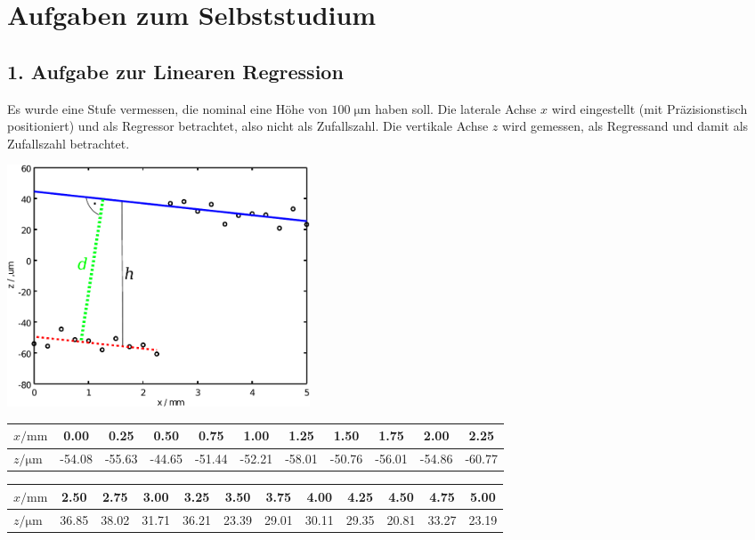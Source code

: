 \section{Aufgaben zum Selbststudium}
\subsection{1. Aufgabe zur Linearen Regression}
\label{Vorl2Regressionsaufg1}
Es wurde eine Stufe vermessen, die nominal eine Höhe von $100 \; \mathrm{\mu m}$ haben soll.
Die laterale Achse $x$ wird eingestellt (mit Präzisionstisch positioniert) 
und als Regressor betrachtet, also nicht als Zufallszahl.
Die vertikale Achse $z$ wird gemessen, als Regressand und damit als Zufallszahl
betrachtet.

\begin{center}
	\includegraphics[width=90mm]{02_vorlesung/media/uebungA5_step_plot.pdf}
\end{center}


\begin{tabular}{l|c|c|c|c|c|c|c|c|c|c}
	\hline
	$x / \mathrm{mm}$ &
	0.00 & 0.25 & 0.50 & 0.75 & 1.00 & 1.25 & 1.50 & 1.75 & 2.00 & 2.25 \\
	\hline
	$z / \mathrm{\mu m}$ &
	-54.08 &-55.63 &-44.65 &-51.44 &-52.21 &-58.01 &-50.76 &-56.01 &-54.86 &-60.77\\ 
	\hline
\end{tabular}

\vspace{2mm}

\begin{tabular}{l|c|c|c|c|c|c|c|c|c|c|c}
	\hline
	$x / \mathrm{mm}$  & 2.50 &
	2.75 & 3.00 & 3.25 & 3.50 & 3.75 & 4.00 & 4.25 & 4.50 & 4.75 & 5.00 \\
	\hline
	$z / \mathrm{\mu m}$ &36.85 &38.02 &31.71 &36.21 &23.39 &29.01 &30.11 &29.35 &20.81 &33.27 &23.19\\
	\hline
\end{tabular}

